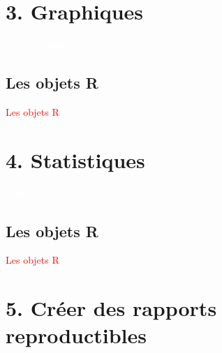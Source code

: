 \documentclass[11pt]{beamer}\usepackage[]{graphicx}\usepackage[]{color}
\begin{document}
\section{3. Graphiques}

\begin{frame}[plain]
\hspace*{-1.0cm}\parbox[t]{\textwidth}{
 \begin{center}
  \Huge{\textcolor{white}{3. Graphiques}}
 \end{center}
 }
\end{frame}

\subsection{Les objets R}

\begin{frame}
 \begin{center}
  \Huge{\textcolor{red}{Les objets R}}
 \end{center}
\end{frame}




\section{4. Statistiques}

\begin{frame}[plain]
\hspace*{-1.0cm}\parbox[t]{\textwidth}{
 \begin{center}
  \Huge{\textcolor{white}{4. Statistiques}}
 \end{center}
 }
\end{frame}

\subsection{Les objets R}

\begin{frame}
 \begin{center}
  \Huge{\textcolor{red}{Les objets R}}
 \end{center}
\end{frame}



\section{5. Cr\'{e}er des rapports reproductibles}
\end{document}
